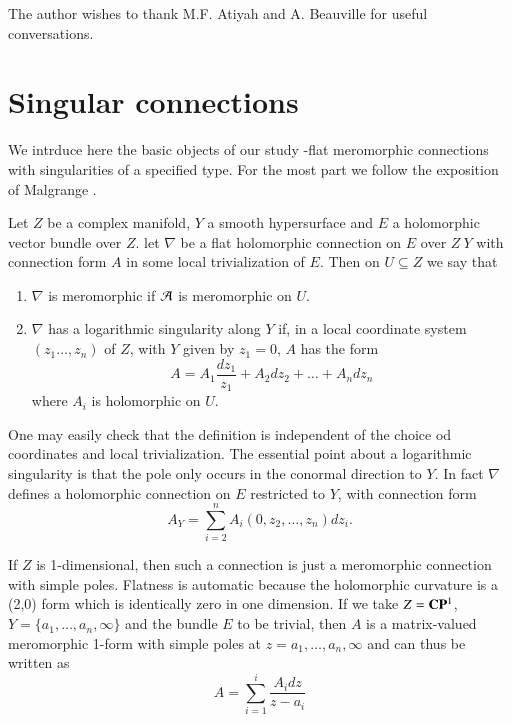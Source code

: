 The author wishes to thank M.F. Atiyah and A. Beauville for useful conversations.

\section{Singular connections}\label{rt7-sec-2}  
We intrduce here the basic objects of our study -flat meromorphic connections with singularities of a specified type. For the most part we follow the exposition of Malgrange \cite{art7-key10}.

\begin{defini}\label{art7-definition-1}
Let $Z$ be a complex manifold, $Y$ a smooth hypersurface and $E$ a holomorphic vector bundle over $Z$. let $\nabla$ be a flat holomorphic connection on $E$ over $Z \ Y$ with connection form $A$ in some local trivialization of $E$. Then on $U\subseteq Z$ we say that
\begin{enumerate}[(1)]
\item $\nabla$ is meromorphic if $\mathcal{A}$ is meromorphic on $U$.

\item $\nabla$ has a logarithmic singularity along $Y$ if, in a local coordinate system $(z_{1}\ldots, z_{n})$ of $Z$, with $Y$ given by $z_{1} = 0$, $A$ has the form
$$
A = A_{1}\dfrac{dz_{1}}{z_{1}} + A_{2}dz_{2} + \ldots + A_{n}dz_{n}
$$
where $A_{i}$ is holomorphic on $U$.
\end{enumerate}
\end{defini}

One may easily check that the definition is independent of the choice od coordinates and local trivialization. The essential point about a logarithmic singularity is that the pole only occurs in the conormal direction to $Y$. In fact $\nabla$ defines a holomorphic connection on $E$ restricted to $Y$, with connection form
$$
A_{Y} = \sum\limits_{i=2}^{n}A_{i}(0, z_{2}, \ldots, z_{n})dz_{i}.
$$

If $Z$ is 1-dimensional, then such a connection is just a meromorphic connection with simple poles. Flatness is automatic because the holomorphic curvature is a (2,0) form which is identically zero in one dimension. If we take $Z=\mathbf{C}\mathbf{P}^{1}$, $Y = \{a_{1}, \ldots, a_{n}, \infty\}$ and the bundle $E$ to be trivial, then $A$ is a matrix-valued meromorphic 1-form with simple poles at $z=a_{1},\ldots, a_{n}, \infty$ and can thus be written as
$$
A = \sum\limits_{i =1}^{i}\dfrac{A_{i}dz}{z-a_{i}}
$$
